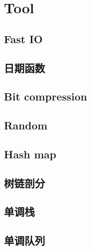 \section{Tool}
\subsection{Fast IO}


\subsection{日期函数}


\subsection{Bit compression}


\subsection{Random}


\subsection{Hash map}


\subsection{树链剖分}


\subsection{单调栈}


\subsection{单调队列}


%

